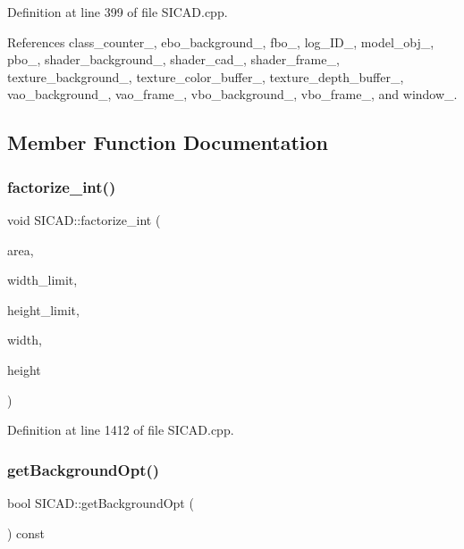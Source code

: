 Definition at line 399 of file S\+I\+C\+A\+D.\+cpp.



References class\+\_\+counter\+\_\+, ebo\+\_\+background\+\_\+, fbo\+\_\+, log\+\_\+\+I\+D\+\_\+, model\+\_\+obj\+\_\+, pbo\+\_\+, shader\+\_\+background\+\_\+, shader\+\_\+cad\+\_\+, shader\+\_\+frame\+\_\+, texture\+\_\+background\+\_\+, texture\+\_\+color\+\_\+buffer\+\_\+, texture\+\_\+depth\+\_\+buffer\+\_\+, vao\+\_\+background\+\_\+, vao\+\_\+frame\+\_\+, vbo\+\_\+background\+\_\+, vbo\+\_\+frame\+\_\+, and window\+\_\+.



\subsection{Member Function Documentation}
\mbox{\label{classSICAD_a2603ec5cb9a31bc7be0a335ef513ab0d}} 
\subsubsection{\texorpdfstring{factorize\+\_\+int()}{factorize\_int()}}
{\footnotesize\ttfamily void S\+I\+C\+A\+D\+::factorize\+\_\+int (\begin{DoxyParamCaption}\item[{const G\+Lsizei}]{area,  }\item[{const G\+Lsizei}]{width\+\_\+limit,  }\item[{const G\+Lsizei}]{height\+\_\+limit,  }\item[{G\+Lsizei \&}]{width,  }\item[{G\+Lsizei \&}]{height }\end{DoxyParamCaption})\hspace{0.3cm}{\ttfamily [private]}}



Definition at line 1412 of file S\+I\+C\+A\+D.\+cpp.

\mbox{\label{classSICAD_a170bd325654aed9eb81062ac610608fa}} 
\subsubsection{\texorpdfstring{get\+Background\+Opt()}{getBackgroundOpt()}}
{\footnotesize\ttfamily bool S\+I\+C\+A\+D\+::get\+Background\+Opt (\begin{DoxyParamCaption}{ }\end{DoxyParamCaption}) const}



